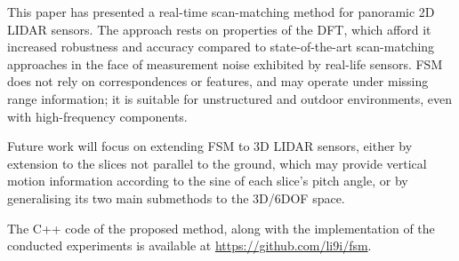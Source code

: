This paper has presented a real-time scan-matching method for panoramic 2D LIDAR
sensors. The approach rests on properties of the DFT, which afford it
increased robustness and accuracy compared to state-of-the-art scan-matching
approaches in the face of measurement noise exhibited by real-life sensors.
FSM does not rely on correspondences or features, and may operate under missing
range information; it is suitable for unstructured and outdoor environments,
even with high-frequency components.

Future work will focus on extending FSM to 3D LIDAR sensors, either by extension
to the slices not parallel to the ground, which may provide vertical motion
information according to the sine of each slice's pitch angle, or by
generalising its two main submethods to the 3D/6DOF space.

The C++ code of the proposed method, along with the implementation of the
conducted experiments is available at \url{https://github.com/li9i/fsm}.
